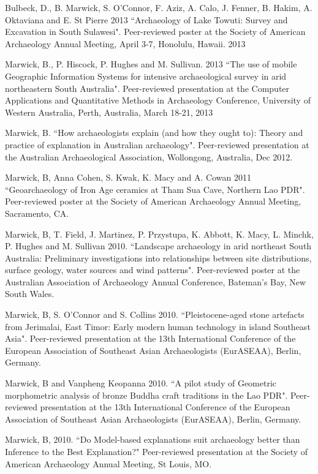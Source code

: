 {{\ind Bulbeck, D., B. Marwick, S. O'Connor, F. Aziz, A. Calo, J. Fenner, B. Hakim, A. Oktaviana and E. St Pierre 2013 ``Archaeology of Lake Towuti: Survey and Excavation in South Sulawesi". Peer-reviewed poster at the Society of American Archaeology Annual Meeting, April 3-7, Honolulu, Hawaii. 2013

\ind Marwick, B., P. Hiscock, P. Hughes and M. Sullivan. 2013 ``The use of mobile Geographic Information Systems for intensive archaeological survey in arid northeastern South Australia". Peer-reviewed presentation at the Computer Applications and Quantitative Methods in Archaeology Conference, University of Western Australia, Perth, Australia, March 18-21, 2013

\ind Marwick, B. ``How archaeologists explain (and how they ought to): Theory and practice of explanation in Australian archaeology". Peer-reviewed presentation at the Australian Archaeological Association, Wollongong, Australia, Dec 2012.

\ind Marwick, B, Anna Cohen, S. Kwak, K. Macy and A. Cowan 2011 ``Geoarchaeology of Iron Age ceramics at Tham Sua Cave, Northern Lao PDR". Peer-reviewed poster at the Society of American Archaeology Annual Meeting, Sacramento, CA.

\ind Marwick, B, T. Field, J. Martinez, P. Przystupa, K. Abbott, K. Macy, L. Minchk, P. Hughes and M. Sullivan 2010. ``Landscape archaeology in arid northeast South Australia: Preliminary investigations into relationships between site distributions, surface geology, water sources and wind patterns". Peer-reviewed poster at the Australian Association of Archaeology Annual Conference, Bateman’s Bay, New South Wales.

\ind Marwick, B, S. O’Connor and S. Collins 2010. ``Pleistocene-aged stone artefacts from Jerimalai, East Timor: Early modern human technology in island Southeast Asia". Peer-reviewed presentation at the 13th International Conference of the European Association of Southeast Asian Archaeologists (EurASEAA), Berlin, Germany.

\ind Marwick, B and Vanpheng Keopanna 2010. ``A pilot study of Geometric morphometric analysis of bronze Buddha craft traditions in the Lao PDR". Peer-reviewed presentation  at the 13th International Conference of the European Association of Southeast Asian Archaeologists (EurASEAA), Berlin, Germany.

\ind Marwick, B, 2010. ``Do Model-based explanations suit archaeology better than Inference to the Best Explanation?" Peer-reviewed presentation at the Society of American Archaeology Annual Meeting, St Louis, MO.

}}

